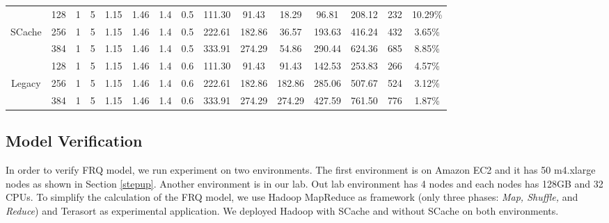 {\begin{table}[!t]
\begin{tabular}{|c||c|c|c|c|c|c|c||c|c|c|c|c|c|c|}
\hline
& 128	& 1 & 5 &	1.15 &	1.46	&	1.4 &	0.5 &	111.30 &	91.43	&	18.29	&	96.81	&	208.12	&	232	&	10.29\%	\\
SCache
& 256	& 1 & 5 &	1.15 &	1.46	&	1.4 &	0.5 &	222.61 &	182.86	&	36.57	&	193.63	&	416.24	&	432	&	3.65\%	\\
& 384	& 1 & 5 &	1.15 &	1.46	&	1.4 &	0.5 &	333.91 &	274.29	&	54.86	&	290.44	&	624.36	&	685 &	8.85\%	\\
\hline
& 128	& 1 & 5 &	1.15 &	1.46	&	1.4 &	0.6 &	111.30 &	91.43	&	91.43	&	142.53	&	253.83	&	266 &	4.57\%	\\
Legacy
& 256	& 1 & 5 &	1.15 &	1.46	&	1.4 &	0.6 &	222.61 &	182.86	&	182.86	&	285.06	&	507.67	&	524 &	3.12\%	\\
& 384	& 1 & 5 &	1.15 &	1.46	&	1.4 &	0.6 &	333.91 &	274.29	&	274.29	&	427.59	&	761.50	&	776 &	1.87\%	\\

\hline
\end{tabular}
\end{table}

\subsection{Model Verification}\label{model_verification}
In order to verify FRQ model, we run experiment on two environments. The first environment is on Amazon EC2 and it has 50 m4.xlarge nodes as shown in Section \ref{stepup}. Another environment is in our lab. Out lab environment has 4 nodes and each nodes has 128GB and 32 CPUs. To simplify the calculation of the FRQ model, we use Hadoop MapReduce as framework (only three phases: \textit{Map, Shuffle,} and \textit{Reduce}) and Terasort as experimental application. We deployed Hadoop with SCache and without SCache on both environments.

}
